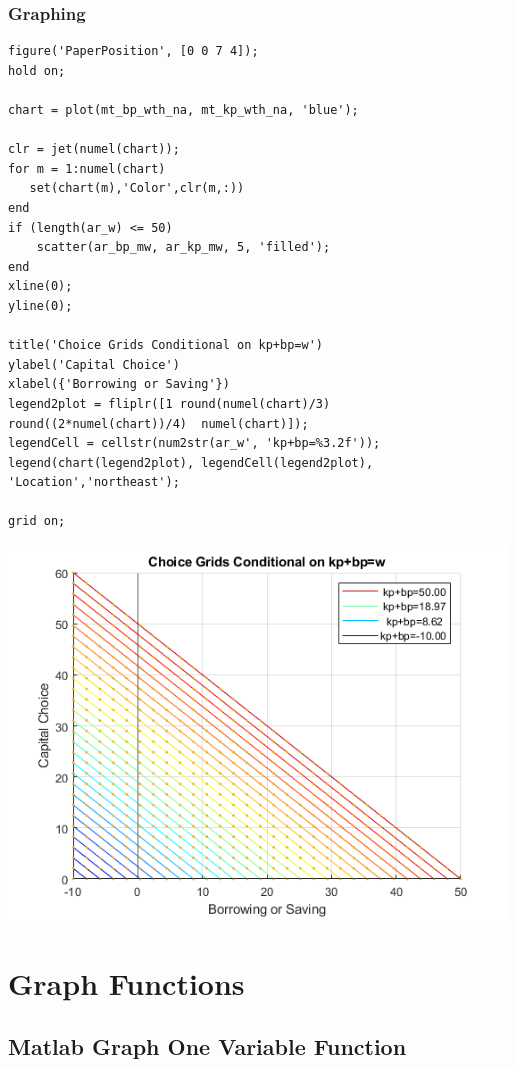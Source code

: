 \documentclass[
]{book}
\begin{document}
\hypertarget{graphing}{%
\subsubsection{Graphing}\label{graphing}}

\begin{verbatim}
figure('PaperPosition', [0 0 7 4]);
hold on;

chart = plot(mt_bp_wth_na, mt_kp_wth_na, 'blue');

clr = jet(numel(chart));
for m = 1:numel(chart)
   set(chart(m),'Color',clr(m,:))
end
if (length(ar_w) <= 50) 
    scatter(ar_bp_mw, ar_kp_mw, 5, 'filled');
end
xline(0);
yline(0);

title('Choice Grids Conditional on kp+bp=w')
ylabel('Capital Choice')
xlabel({'Borrowing or Saving'})
legend2plot = fliplr([1 round(numel(chart)/3) round((2*numel(chart))/4)  numel(chart)]);
legendCell = cellstr(num2str(ar_w', 'kp+bp=%3.2f'));
legend(chart(legend2plot), legendCell(legend2plot), 'Location','northeast');

grid on;
\end{verbatim}

\includegraphics[width=5.20833in,height=\textheight]{img/fs_specline_images/figure_0.png}

\hypertarget{graph-functions}{%
\section{Graph Functions}\label{graph-functions}}

\hypertarget{matlab-graph-one-variable-function}{%
\subsection{Matlab Graph One Variable Function}\label{matlab-graph-one-variable-function}}
\end{document}
